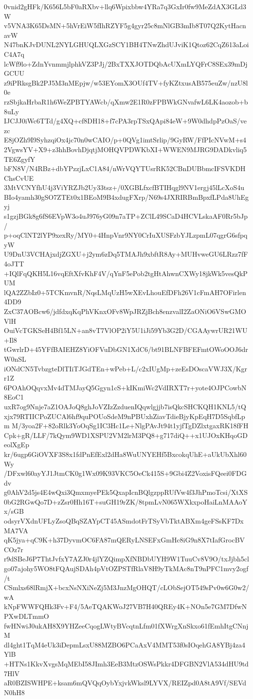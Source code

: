 0vnid2gHFk/K656L5bF0aRXbv+llq6Wpixbbw4YRa7q3GxIr0fw9MeZdAX3GLd3W
v5VNA3K65DsMN+5hVrEiW5fIhRZYF5g4gyr25c8mNlGB3mIb8T07Q2KytHacnavW
N47bnKJvDUNL2NYLGHUQLXGzSCY1BH4TNwZhdUJviK1Qtoz62CqZ613aLoiC4A7q
lcWf9lo+ZdnYvnmmjlphkVZ3PJj/2BxTXXJOTDQbAcUXmLYQFrC8SEx39mDjGCUU
z9iPRksgBk2PJ5M3nMEpjw/w53EYomX3OUf4TV+fyKZtxusAB575euZw/nzU8l0e
rzSbjkaHrbaR1h6WeZPBTYAWcb/qXmw2E1R0zFPBWkGNvafwL6LK4aozob+b8uLy
IJCJJ0iWc6TTd/g4XQ+cf8DH18+f7cPA3rpTSxQApi84eW+9W0dhdpPzOaS/vezc
E8jOZh9I9SyhzqiOx4jc70n0wCAIO/p+0QVg1imtSrlip/9GyRW/FfPIcNVwM+s4
2VgwsYV+X9+z3hhBovhDjqtjMOHQVPDWKbXI+WWEN9MJRG9DADkvliq5TE6ZgyfY
bFN8V/N4RBz+dbYPzzjLxC1A84/nWrVQYTUsrRK52CBnDUBbmcIFSVKDHChsCvUE
3MtVCNYfhU4j3ViYRZJb2Uy33tsz+/0XGBLfxcfBTIHqgl9NV1ergj45lLcXoS4u
BIo4yamh30gSO7ZTEt0x1BEoM9B4xdugFXrp/N69s4JXRIRBmBpxfLPda8UhEgyj
s1gzjBGk8g6fS6EVpW3o4uJ976yG09n7aTP+ZClL49SCaD4HCVLskaAF0Rr5bJp/
p+oqClNT2lYP9xexRy/MY0+4HnpVnr9NY0CrIuXUSFzbYJLzpmL07qgrG6sfpqyW
U9DnU3VCHAjxdjZGXU+j2ym6zDq5TMAJh9xbftR8Ay+MUHvweGU6LRzz7fF4oJTT
+IQlFqQKH5L16vqEftXfvKhF4V/qYnF5ePob2tgHtAhwnCXWy18jkWk5vesQkPUM
lQA2ZZbIz0+5TCKmvnR/NqsLMqUzH5wXEvLhouEfDFh26V1cFmAH7OFirlen4DD9
ZxC37AOBcw6/jdfdxqKqPhVKnxOFv8WpJRZjBch8enzvalI2ZaONiO6VSwGMOVlH
OuiVcTGKSeH4Bf15LN+an8vT7VlOP2iY5U1iJi59Yb3G2D/CGAAywrUR21WU+Il8
tGwrlrD+45YFfBAIEHZ8YiOFVuDbGN1XdC6/bt91BLNFBFEFmtOWoOOJ6drW0nSL
iONdCN5TvbzgteDlTIiTJGdTEn+wPeb+L/c2xIUgMp+zeEsDOscaVWJ3X/Kgrr1Z
6POAhOQqvxMv4dTMJayQ5Ggyn1cS+kIKmiWc2VdIRXT7r+yote4OJPCowbN8EoC1
uxR7og9Nnje7aZ1OAJoQ8ghJoVZIzZzduenIQqwlgjjb7isQkcSHCKQH1KNL5/tQ
xjx79RTIICPoZUCAl6hf9quPOUoSdeM9nPBUxhZiavTdieBjyKpEqH7D5SqbfLpm
M/3yoa2F+82oRlk3YoOqSg1IC3Hc1Le+NlgPAvJt94t1yjfTgDZlxtgaxRK18fFH
Cpk+gR/LLF/7kQym9WD1XSPU2VM2lrM3PQ8+g717diQ++x1UJOxKHqoGDeolXgEp
kr/6ugp6GiOVXF3S8x1fdPnEfExl2dHa8WuUNYEHf5BxcokqUhE+aUkUbXhl60Wy
/DFxwl60ayYJ1JtmCK0g1Wx09K93VKC5OeCk415S+9Gbi4Z2VoxisFQeei0FDGdv
g0AhV2d5js4E4wQxi3QmxmyePEk5QxapIcnBQlgzppRUfVw4f3JhPmoTcsi/XtXS
0bG2RGwQo7D+zZsr0Hh16T+suGH19rZK/8tpmLvN065WXkxpoHaiLnMAAoYx/sGB
odsyrVXdnUFLyZsoQBqSZAYpCT45ASmdotFrTSyVbTktABXm4geFSsKF7DxMA7VA
qK5jya+qC9K+h37DyvmOC6FA87mQERyLNSEFxGmHc8iG9n8X7tIafGrocBVCOz7r
r9dSBeJ6P7ThtJvfxY7AZJ0r4jlYZQimpXfNBDbUYH9W1TuuCv8V9O/txJjbh5cl
go07ajohy5WO8tFQAujSDAh4pVtOZPSTfRlaV8H9yTkMAc8nT9nPFC1mvy2ogf/t
CSmlxs68lRmjX+bcxNsNXiNeZj5M3JnzMgOHQT/cLObSejOT549sPv0w6G0w2/wA
kNpFWWFQHk3Fv+F4/5AeTQAKWoJ27VB7H40QREy4K+NOn5e7GM7DfwNPXwDLTmmO
fwHNwiJ0ukAH8X9YHZeeCqogLWtyBVcqtnLfm01fXWrgXnSkxo61fEmhItgCNnjM
dl4ght1TqM4eUk3iDepmLsxU88MZBO6PCaAxV4MMT53f0sIOqehGA8YBj4za4YlB
+HTNs1KkvXvgsMqMEbI58JImh3EeB3MtzOSWsPkkr4DFGBN2VlA534dHU9td7HlV
aR0BZISWHPE+ksam6mQVQqOybYxjvkWksl9LYVX/REIZpd0A8tA9Vf/SEVdN0hH8

